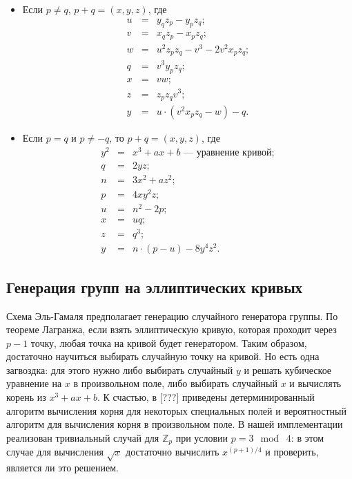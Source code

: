 \documentclass[a4paper,14pt]{extarticle}
\begin{document}
\begin{itemize}
    \item Если $p \ne q$, $p + q = (x, y, z)$, где
        \[
            \begin{array}{rcl}
                u &=& y_q z_p - y_p z_q; \\
                v &=& x_q z_p - x_p z_q; \\
                w &=& u^2 z_p z_q - v^3 - 2 v^2 x_p z_q; \\
                q &=& v^3 y_p z_q; \\
                x &=& v w; \\
                z &=& z_p z_q v^3; \\
                y &=& u \cdot (v^2 x_p z_q - w) - q.
            \end{array}
        \]
    \item Если $p = q$ и $p \ne -q$, то $p + q = (x, y, z)$, где
        \[
            \begin{array}{rcl}
                y^2 &=& x^3 + a x + b \text{ --- уравнение кривой}; \\
                q &=& 2 y z; \\
                n &=& 3 x^2 + a z^2; \\
                p &=& 4 x y^2 z; \\
                u &=& n^2 - 2 p; \\

                x &=& u q; \\
                z &=& q^3; \\
                y &=& n \cdot (p - u) - 8 y^4 z^2.
            \end{array}
        \]
\end{itemize}

\subsection{Генерация групп на эллиптических кривых}

Схема Эль-Гамаля предполагает генерацию случайного генератора группы. По теореме
Лагранжа, если взять эллиптическую кривую, которая проходит через $p - 1$ точку,
любая точка на кривой будет генератором. Таким образом, достаточно научиться
выбирать случайную точку на кривой. Но есть одна загвоздка: для этого нужно либо
выбирать случайный $y$ и решать кубическое уравнение на $x$ в произвольном поле,
либо выбирать случайный $x$ и вычислять корень из $x^3 + a x + b$. К счастью, в
[???] приведены детерминированный алгоритм вычисления корня для некоторых
специальных полей и вероятностный алгоритм для вычисления корня в произвольном
поле. В нашей имплементации реализован тривиальный случай для $\mathbb{Z}_p$
при условии $p = 3 \mod \;4$: в этом случае для вычисления $\sqrt{x}$ достаточно
вычислить $x^{(p + 1) / 4}$ и проверить, является ли это решением.
\end{document}
